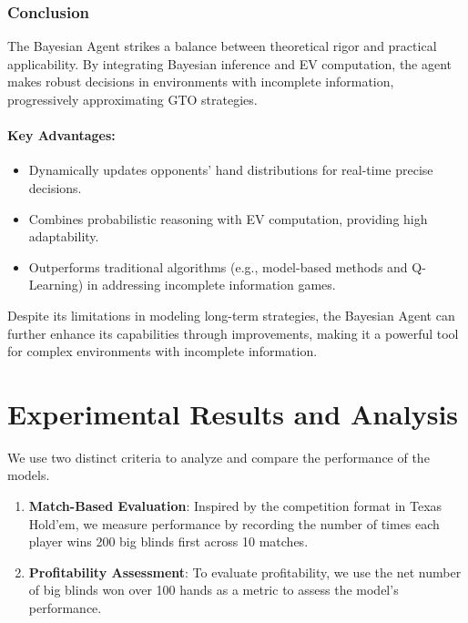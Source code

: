 \documentclass{article}
\begin{document}
\subsubsection*{Conclusion}
The Bayesian Agent strikes a balance between theoretical rigor and practical applicability. By integrating Bayesian inference and EV computation, the agent makes robust decisions in environments with incomplete information, progressively approximating GTO strategies.

\paragraph{Key Advantages:}
\begin{itemize}
    \item Dynamically updates opponents' hand distributions for real-time precise decisions.
    \item Combines probabilistic reasoning with EV computation, providing high adaptability.
    \item Outperforms traditional algorithms (e.g., model-based methods and Q-Learning) in addressing incomplete information games.
\end{itemize}

Despite its limitations in modeling long-term strategies, the Bayesian Agent can further enhance its capabilities through improvements, making it a powerful tool for complex environments with incomplete information.
\section{Experimental Results and Analysis}
We use two distinct criteria to analyze and compare the performance of the models.

\begin{enumerate}
    \item \textbf{Match-Based Evaluation}: Inspired by the competition format in Texas Hold'em, we measure performance by recording the number of times each player wins 200 big blinds first across 10 matches.
    \item \textbf{Profitability Assessment}: To evaluate profitability, we use the net number of big blinds won over 100 hands as a metric to assess the model's performance.
\end{enumerate}
\end{document}
